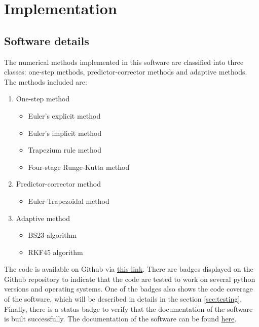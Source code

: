 \chapter{Implementation}
\label{chap:code-implementation}
\section{Software details}
The numerical methods implemented in this software are classified into three classes: one-step methods, predictor-corrector methods and adaptive methods. The methods included are:
\begin{enumerate}
    \item One-step method
    \begin{itemize}
        \item Euler's explicit method
        \item Euler's implicit method
        \item Trapezium rule method
        \item Four-stage Runge-Kutta method
    \end{itemize}
    \item Predictor-corrector method
    \begin{itemize}
        \item Euler-Trapezoidal method
    \end{itemize}
    \item Adaptive method
    \begin{itemize}
        \item BS23 algorithm
        \item RKF45 algorithm
    \end{itemize}
\end{enumerate}
The code is available on Github via \href{https://github.com/FarmHJ/numerical-solver}{this link}. There are badges displayed on the Github repository to indicate that the code are tested to work on several python versions and operating systems. One of the badges also shows the code coverage of the software, which will be described in details in the section \ref{sec:testing}. Finally, there is a status badge to verify that the documentation of the software is built successfully. The documentation of the software can be found \href{https://numerical-solver.readthedocs.io/en/latest/index.html}{here}. 

